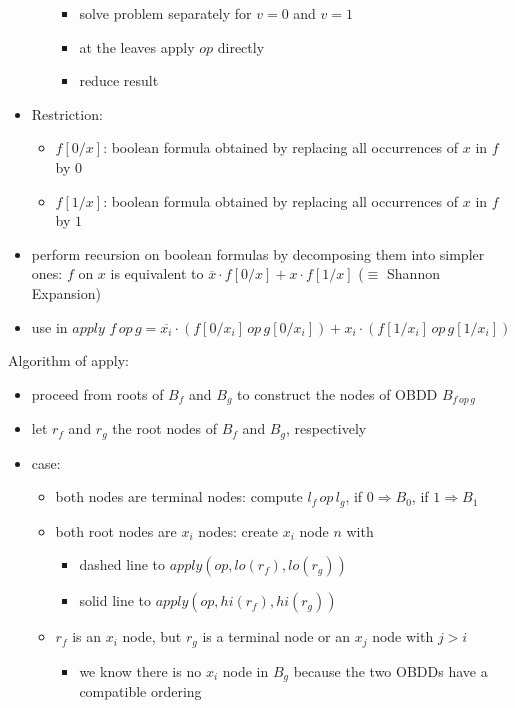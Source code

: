\documentclass[a4paper, 10pt]{article}
\begin{document}
\begin{mdframed}
\begin{itemize}
\begin{itemize}
\begin{itemize}
            \item solve problem separately for $v=0$ and $v=1$
            \item at the leaves apply $op$ directly
            \item reduce result
        \end{itemize}
    \end{itemize}
    \item Restriction:
    \begin{itemize}
        \item $f[0/x]$: boolean formula obtained by replacing all occurrences of $x$ in $f$ by $0$
        \item $f[1/x]$: boolean formula obtained by replacing all occurrences of $x$ in $f$ by $1$
    \end{itemize}
    \item perform recursion on boolean formulas by decomposing them into simpler ones: $f$ on $x$ is equivalent to $\overline{x}\cdot f[0/x]+x\cdot f[1/x]$ {\tiny ($\equiv$ Shannon Expansion)}
    \item use in $apply$
    $f\,op\,g = \overline{x_i}\cdot(f[0/x_i]\,op\,g[0/x_i])+x_i\cdot(f[1/x_i]\,op\,g[1/x_i])$
\end{itemize}
Algorithm of apply:
\begin{itemize}
    \item proceed from roots of $B_f$ and $B_g$ to construct the nodes of OBDD $B_{f\,op\,g}$
    \item let $r_f$ and $r_g$ the root nodes of $B_f$ and $B_g$, respectively
    \item case:
    \begin{itemize}
        \item both nodes are terminal nodes: compute $l_f\,op\,l_g$, if $0\Rightarrow B_0$, if $1\Rightarrow B_1$
        \item both root nodes are $x_i$ nodes: create $x_i$ node $n$ with
        \begin{itemize}
            \item dashed line to $apply(op,lo(r_f),lo(r_g))$
            \item solid line to $apply(op,hi(r_f),hi(r_g))$
        \end{itemize}
        \item $r_f$ is an $x_i$ node, but $r_g$ is a terminal node or an $x_j$ node with $j>i$
        \begin{itemize}
            \item we know there is no $x_i$ node in $B_g$ because the two OBDDs have a compatible ordering \\

\end{itemize}
\end{itemize}
\end{itemize}
\end{mdframed}
\end{document}
